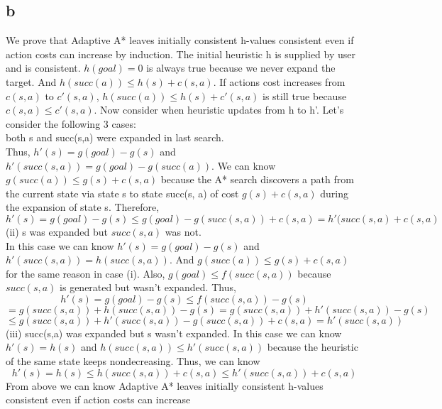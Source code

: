 \documentclass[11pt]{article}
\begin{document}
\subsection*{b}
We prove that Adaptive A*
leaves initially consistent h-values consistent even if action costs can increase by induction. The initial heuristic h is supplied by user and is consistent. $h(goal)=0$ is always true because we  never expand the target. And $h(succ(a))\leq h(s)+c(s,a)$. If actions cost increases from $c(s,a)$ to $c'(s,a)$, $h(succ(a))\leq h(s)+c'(s,a)$ is  still true because $c(s,a)\leq c'(s,a)$. Now consider when heuristic updates from h to h'.  Let's consider the following 3 cases:\\
 both s and succ(s,a) were expanded in last search.\\  Thus,
$h'(s)=g(goal)-g(s)$ and $h'(succ(s,a))=g(goal)-g(succ(a))$. We can know $g(succ(a))\leq g(s)+c(s,a)$ because the A* search discovers a path from the current state via
state s to state succ(s, a) of cost $g(s)+c(s,a)$ during
the expansion of state s. Therefore, $$h'(s)=g(goal)-g(s)\leq g(goal)-g(succ(s,a))+c(s,a)=h'(succ(s,a)+c(s,a)$$
(ii) s was expanded but $succ(s,a)$ was not.\\
In this case we can know $h'(s)=g(goal)-g(s)$ and $h'(succ(s,a))=h(succ(s,a))$. And $g(succ(a))\leq g(s)+c(s,a)$ for the same reason in case (i). Also, $g(goal)\leq f(succ(s,a))$ because $succ(s,a)$ is generated but wasn't expanded. Thus, $$h'(s)=g(goal)-g(s)\leq f(succ(s,a))-g(s)$$
$$=g(succ(s,a))+h(succ(s,a))-g(s)=g(succ(s,a))+h'(succ(s,a))-g(s)$$
$$\leq g(succ(s,a))+h'(succ(s,a))-g(succ(s,a))+c(s,a)=h'(succ(s,a))$$
(iii) succ(s,a) was expanded but s wasn't expanded. In this case we can know $h'(s)=h(s)$ and  $h(succ(s,a))\leq h'(succ(s,a))$ because the heuristic of the same state keeps nondecreasing. Thus, we can know $$h'(s)=h(s)\leq h(succ(s,a))+c(s,a)\leq h'(succ(s,a))+c(s,a)$$ 
From above we can  know Adaptive A*
leaves initially consistent h-values consistent even if action costs can increase
\end{document}
